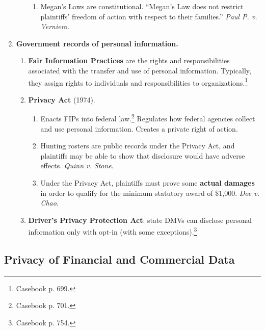 \begin{enumerate}
\begin{enumerate}
\begin{enumerate}
            \item Megan's Laws are constitutional. ``Megan's Law does not 
            restrict plaintiffs' freedom of action with respect to their 
            families.'' \emph{Paul P. v. Verniero}.
        \end{enumerate}
    \end{enumerate}
    \item \textbf{Government records of personal information.}
    \begin{enumerate}
        \item \textbf{Fair Information Practices} are the rights and 
        responsibilities associated with the transfer and use of personal 
        information. Typically, they assign rights to individuals and 
        responsibilities to organizations.\footnote{Casebook p. 699.}
        \item \textbf{Privacy Act} (1974).
        \begin{enumerate}
            \item Enacts FIPs into federal law.\footnote{Casebook p. 701.} 
            Regulates how federal agencies collect and use personal 
            information. Creates a private right of action.
            \item Hunting rosters are public records under the Privacy Act, 
            and plaintiffs may be able to show that disclosure would have 
            adverse effects. \emph{Quinn v. Stone}.
            \item Under the Privacy Act, plaintiffs must prove some 
            \textbf{actual damages} in order to qualify for the minimum 
            statutory award of \$1,000. \emph{Doe v. Chao}.
        \end{enumerate}
        \item \textbf{Driver's Privacy Protection Act}: state DMVs can 
        disclose personal information only with opt-in (with some 
        exceptions).\footnote{Casebook p. 754.}
    \end{enumerate}
\end{enumerate}

\newpage

\subsection{Privacy of Financial and Commercial Data}

